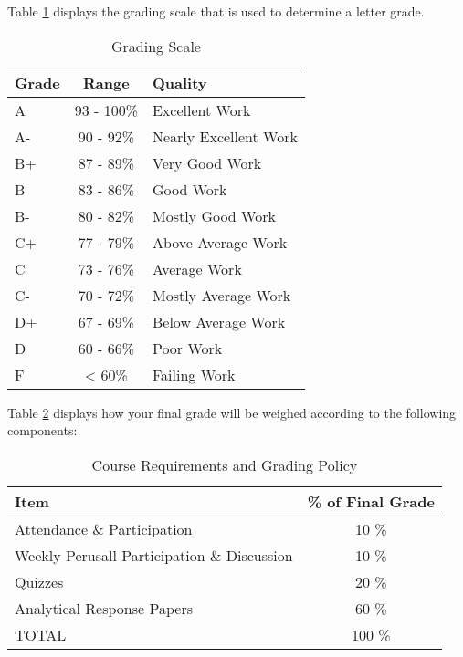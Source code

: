 \documentclass[11pt,]{article}
\begin{document}
Table \ref{tab:grade_scale} displays the grading scale that is used to
determine a letter grade.

\renewcommand{\arraystretch}{1.5}

\begin{table}[!h]

\caption{\label{tab:grade_scale}Grading Scale}
\centering
\fontsize{10}{12}\selectfont
\begin{tabular}[t]{l|c|l}
\hline
\textbf{Grade} & \textbf{Range} & \textbf{Quality}\\
\hline
A & 93 - 100\% & Excellent Work\\
\hline
A- & 90 - 92\% & Nearly Excellent Work\\
\hline
B+ & 87 - 89\% & Very Good Work\\
\hline
B & 83 - 86\% & Good Work\\
\hline
B- & 80 - 82\% & Mostly Good Work\\
\hline
C+ & 77 - 79\% & Above Average Work\\
\hline
C & 73 - 76\% & Average Work\\
\hline
C- & 70 - 72\% & Mostly Average Work\\
\hline
D+ & 67 - 69\% & Below Average Work\\
\hline
D & 60 - 66\% & Poor Work\\
\hline
F & < 60\% & Failing Work\\
\hline
\end{tabular}
\end{table}

Table \ref{tab:weight_table} displays how your final grade will be
weighed according to the following components:

\renewcommand{\arraystretch}{1.5}

\begin{table}[!h]

\caption{\label{tab:weight_table}Course Requirements and Grading Policy}
\centering
\fontsize{10}{12}\selectfont
\begin{tabular}[t]{lc}
\toprule
\textbf{Item} & \textbf{\% of Final Grade}\\
\midrule
Attendance \& Participation & 10 \%\\
Weekly Perusall Participation \& Discussion & 10 \%\\
Quizzes & 20 \%\\
Analytical Response Papers & 60 \%\\
TOTAL & 100 \%\\
\bottomrule
\end{tabular}
\end{table}
\end{document}
